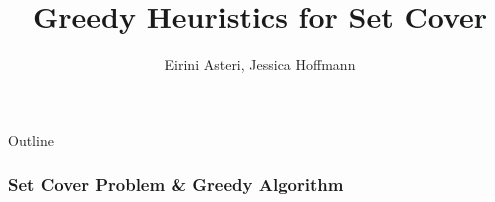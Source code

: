 \documentclass[xcolor=dvipsnames]{beamer}
\title[Your Short Title]{Greedy Heuristics for Set Cover}
\author{Eirini Asteri, Jessica Hoffmann}
\institute{University of Texas, Austin}
\date{}
\begin{document}
\begin{frame}
  \titlepage
\end{frame}

\begin{frame}{Outline}
  \tableofcontents
\end{frame}

\begin{frame}
\frametitle{Set Cover Problem \& Greedy Algorithm}
\begin{minipage}{0.45\textwidth}
\begin{overlayarea}{\textwidth}{0.5\textheight}
% 
% 

\end{overlayarea}
\end{minipage}
\end{frame}
\end{document}

